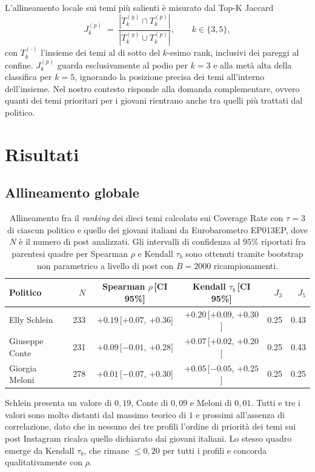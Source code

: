 \documentclass[11pt, a4paper]{article}
\begin{document}
L'allineamento locale sui temi pi\`u salienti \`e misurato dal Top-K
Jaccard
\[
  J_k^{(p)} \;=\; \frac{|T_k^{(y)} \cap T_k^{(p)}|}{|T_k^{(y)} \cup T_k^{(p)}|},
  \qquad k\in\{3,5\},
\]
con $T_k^{(\cdot)}$ l'insieme dei temi al di sotto del $k$-esimo rank,
inclusivi dei pareggi al confine. $J_k^{(p)}$ guarda esclusivamente al
podio per $k=3$ e alla met\`a alta della classifica per $k=5$,
ignorando la posizione precisa dei temi all'interno dell'insieme. Nel
nostro contesto risponde alla domanda complementare, ovvero quanti dei
temi prioritari per i giovani rientrano anche tra quelli pi\`u
trattati dal politico.

\section{Risultati}

\subsection{Allineamento globale}

\begin{table}[!htbp]
\centering
\caption{Allineamento fra il \textit{ranking} dei dieci temi calcolato
sui Coverage Rate con $\tau=3$ di ciascun politico e quello dei
giovani italiani da Eurobarometro EP013EP, dove $N$ \`e il numero di
post analizzati. Gli intervalli di confidenza al $95\%$ riportati
fra parentesi quadre per Spearman $\rho$ e Kendall $\tau_b$ sono
ottenuti tramite bootstrap non parametrico a livello di post con
$B=2000$ ricampionamenti.}
\label{tab:align}
\small
\begin{tabular}{l r c c r r}
\toprule
\textbf{Politico} & \textbf{$N$} & \textbf{Spearman $\rho$\,[CI 95\%]} &
\textbf{Kendall $\tau_b$\,[CI 95\%]} & \textbf{$J_3$} & \textbf{$J_5$} \\
\midrule
Elly Schlein      & 233 & $+0.19$\,[$+0.07$, $+0.36$] & $+0.20$\,[$+0.09$, $+0.30$] & 0.25 & 0.43 \\
Giuseppe Conte    & 231 & $+0.09$\,[$-0.01$, $+0.28$] & $+0.07$\,[$+0.02$, $+0.20$] & 0.25 & 0.43 \\
Giorgia Meloni    & 278 & $+0.01$\,[$-0.07$, $+0.30$] & $+0.05$\,[$-0.05$, $+0.25$] & 0.25 & 0.25 \\
\bottomrule
\end{tabular}
\end{table}

Schlein presenta un valore di $0{,}19$,
Conte di $0{,}09$ e Meloni di $0{,}01$. Tutti e tre i valori sono
molto distanti dal massimo teorico di $1$ e prossimi all'assenza di
correlazione, dato che in nessuno dei tre profili l'ordine di
priorit\`a dei temi sui post Instagram ricalca quello dichiarato dai
giovani italiani. Lo stesso quadro emerge da Kendall $\tau_b$, che
rimane $\leq 0{,}20$ per tutti i profili e concorda qualitativamente
con $\rho$.
\end{document}
